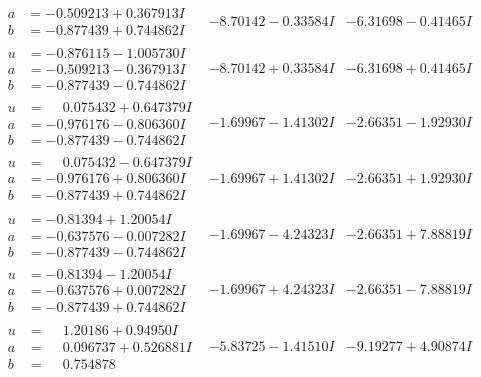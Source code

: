 \documentclass[1p]{elsarticle_modified}
\theoremstyle{definition}
\begin{document}
$$\begin{array}{c|c|c}
\begin{aligned}
a &= -0.509213 + 0.367913 I \\
b &= -0.877439 + 0.744862 I\end{aligned}
 & -8.70142 - 0.33584 I & -6.31698 - 0.41465 I \\ \hline\begin{aligned}
u &= -0.876115 - 1.005730 I \\
a &= -0.509213 - 0.367913 I \\
b &= -0.877439 - 0.744862 I\end{aligned}
 & -8.70142 + 0.33584 I & -6.31698 + 0.41465 I \\ \hline\begin{aligned}
u &= \phantom{-}0.075432 + 0.647379 I \\
a &= -0.976176 - 0.806360 I \\
b &= -0.877439 - 0.744862 I\end{aligned}
 & -1.69967 - 1.41302 I & -2.66351 - 1.92930 I \\ \hline\begin{aligned}
u &= \phantom{-}0.075432 - 0.647379 I \\
a &= -0.976176 + 0.806360 I \\
b &= -0.877439 + 0.744862 I\end{aligned}
 & -1.69967 + 1.41302 I & -2.66351 + 1.92930 I \\ \hline\begin{aligned}
u &= -0.81394 + 1.20054 I \\
a &= -0.637576 - 0.007282 I \\
b &= -0.877439 - 0.744862 I\end{aligned}
 & -1.69967 - 4.24323 I & -2.66351 + 7.88819 I \\ \hline\begin{aligned}
u &= -0.81394 - 1.20054 I \\
a &= -0.637576 + 0.007282 I \\
b &= -0.877439 + 0.744862 I\end{aligned}
 & -1.69967 + 4.24323 I & -2.66351 - 7.88819 I \\ \hline\begin{aligned}
u &= \phantom{-}1.20186 + 0.94950 I \\
a &= \phantom{-}0.096737 + 0.526881 I \\
b &= \phantom{-}0.754878\phantom{ +0.000000I}\end{aligned}
 & -5.83725 - 1.41510 I & -9.19277 + 4.90874 I \\ \hline\begin{aligned}

\end{aligned}
\end{array}$$
\end{document}
